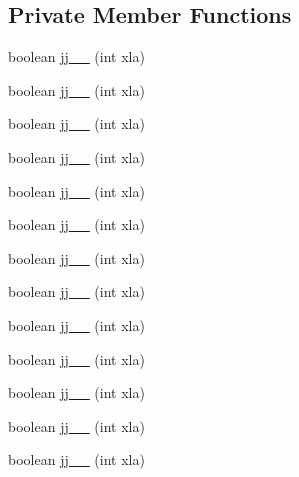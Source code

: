 \subsection*{Private Member Functions}
\begin{DoxyCompactItemize}
\item 
boolean \hyperlink{classorg_1_1coode_1_1owl_1_1krssparser_1_1_k_r_s_s_parser_a1a3e5a4241d86dc0a397cb13efed93bc}{jj\-\_\-\_} (int xla)
\item 
boolean \hyperlink{classorg_1_1coode_1_1owl_1_1krssparser_1_1_k_r_s_s_parser_af82b13413c24d60fa85e9d8f17c47f19}{jj\-\_\-\_} (int xla)
\item 
boolean \hyperlink{classorg_1_1coode_1_1owl_1_1krssparser_1_1_k_r_s_s_parser_a25c1d721aeb641a903ee60fb4ba1dce2}{jj\-\_\-\_} (int xla)
\item 
boolean \hyperlink{classorg_1_1coode_1_1owl_1_1krssparser_1_1_k_r_s_s_parser_ac4c94db996334f24db0bf87142c7bf68}{jj\-\_\-\_} (int xla)
\item 
boolean \hyperlink{classorg_1_1coode_1_1owl_1_1krssparser_1_1_k_r_s_s_parser_add7e6e62b685e726ed082ff2b4f373f2}{jj\-\_\-\_} (int xla)
\item 
boolean \hyperlink{classorg_1_1coode_1_1owl_1_1krssparser_1_1_k_r_s_s_parser_ac53dc450c69220bb87a6de894c981c1b}{jj\-\_\-\_} (int xla)
\item 
boolean \hyperlink{classorg_1_1coode_1_1owl_1_1krssparser_1_1_k_r_s_s_parser_a6c0c7ec0857fe51a25734e4110b6b28d}{jj\-\_\-\_} (int xla)
\item 
boolean \hyperlink{classorg_1_1coode_1_1owl_1_1krssparser_1_1_k_r_s_s_parser_a805a5b10665e207bdd2b626901d66cd7}{jj\-\_\-\_} (int xla)
\item 
boolean \hyperlink{classorg_1_1coode_1_1owl_1_1krssparser_1_1_k_r_s_s_parser_a69248532fc309564005505c065d2b1f8}{jj\-\_\-\_} (int xla)
\item 
boolean \hyperlink{classorg_1_1coode_1_1owl_1_1krssparser_1_1_k_r_s_s_parser_a6fac0b6e64436d39b77fe65bcdb78afe}{jj\-\_\-\_} (int xla)
\item 
boolean \hyperlink{classorg_1_1coode_1_1owl_1_1krssparser_1_1_k_r_s_s_parser_a70ff14403d3e0a4779fcc2113051e292}{jj\-\_\-\_} (int xla)
\item 
boolean \hyperlink{classorg_1_1coode_1_1owl_1_1krssparser_1_1_k_r_s_s_parser_a1d6317cca069b13303acf11b2c8f66a6}{jj\-\_\-\_} (int xla)
\item 
boolean \hyperlink{classorg_1_1coode_1_1owl_1_1krssparser_1_1_k_r_s_s_parser_a6cb55c5208038b05f00c717d977e0427}{jj\-\_\-\_} (int xla)

\end{DoxyCompactItemize}
